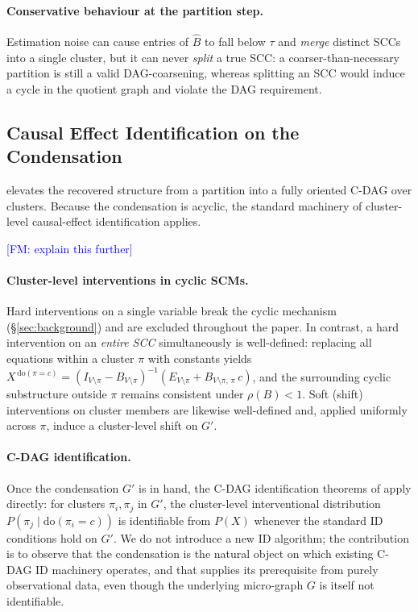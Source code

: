 \documentclass{article}
\newcommand{\fransays}[1]{\textcolor{blue}{[FM: #1]}}
\begin{document}
\paragraph{Conservative behaviour at the partition step.} Estimation noise can cause entries of $\hat B$ to fall below $\tau$ and \emph{merge} distinct SCCs into a single cluster, but it can never \emph{split} a true SCC: a coarser-than-necessary partition is still a valid DAG-coarsening, whereas splitting an SCC would induce a cycle in the quotient graph and violate the DAG requirement.


\subsection{Causal Effect Identification on the Condensation}
\label{sec:effects}

 elevates the recovered structure from a partition into a fully oriented C-DAG over clusters. Because the condensation is acyclic, the standard machinery of cluster-level causal-effect identification applies.

\fransays{explain this further}
\paragraph{Cluster-level interventions in cyclic SCMs.} Hard interventions on a single variable break the cyclic mechanism (\S\ref{sec:background}) and are excluded throughout the paper. In contrast, a hard intervention on an \emph{entire SCC} simultaneously is well-defined: replacing all equations within a cluster $\pi$ with constants yields $X^{\,\mathrm{do}(\pi = c)} = (I_{V \setminus \pi} - B_{V \setminus \pi})^{-1} (E_{V \setminus \pi} + B_{V \setminus \pi,\,\pi}\, c)$, and the surrounding cyclic substructure outside $\pi$ remains consistent under $\rho(B) < 1$. Soft (shift) interventions on cluster members are likewise well-defined and, applied uniformly across $\pi$, induce a cluster-level shift on $G'$.

\paragraph{C-DAG identification.} Once the condensation $G'$ is in hand, the C-DAG identification theorems of \citet{anand2023causal} apply directly: for clusters $\pi_i, \pi_j$ in $G'$, the cluster-level interventional distribution $P(\pi_j \mid \mathrm{do}(\pi_i = c))$ is identifiable from $P(X)$ whenever the standard ID conditions hold on $G'$. We do not introduce a new ID algorithm; the contribution is to observe that the condensation is the natural object on which existing C-DAG ID machinery operates, and that  supplies its prerequisite from purely observational data, even though the underlying micro-graph $G$ is itself not identifiable.
\end{document}
